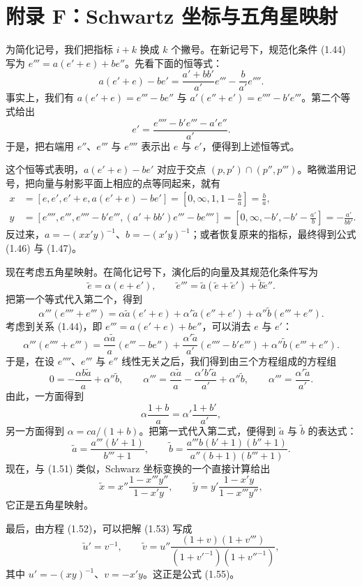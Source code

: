 \section{附录 F：Schwartz 坐标与五角星映射}

为简化记号，我们把指标 $i+k$ 换成 $k$ 个撇号。在新记号下，规范化条件 (1.44) 写为 $e'''=a(e'+e)+be''$。先看下面的恒等式：
\[
a(e'+e)-be'=\frac{a'+bb'}{a'}e'''-\frac{b}{a'}e''''.
\]
事实上，我们有 $a(e'+e)=e'''-be''$ 与 $a'(e''+e')=e''''-b'e'''$。第二个等式给出
\[
e'=\frac{e''''-b'e'''-a'e''}{a'}.
\]
于是，把右端用 $e''$、$e'''$ 与 $e''''$ 表示出 $e$ 与 $e'$，便得到上述恒等式。

这个恒等式表明，$a(e'+e)-be'$ 对应于交点 $(p,p')\cap(p'',p''')$。略微滥用记号，把向量与射影平面上相应的点等同起来，就有
\begin{equation}
\begin{aligned}
x&=\left[e,e',e'+e,a(e'+e)-be'\right]
 =\left[0,\infty,1,1-\frac ba\right] =\frac ba,\\
y&=\left[e'''',e''',e''''-b'e''',(a'+bb')e'''-be''''\right]
 =\left[0,\infty,-b',-b'-\frac{a'}{b}\right] =-\frac{a'}{bb'}.
\end{aligned}
\tag{1.58}\label{eq:1.58}
\end{equation}
反过来，$a=-(xx'y)^{-1}$、$b=-(x'y)^{-1}$；或者恢复原来的指标，最终得到公式 (1.46) 与 (1.47)。

现在考虑五角星映射。在简化记号下，演化后的向量及其规范化条件写为
\[
\tilde e=\alpha(e+e'),\qquad
\tilde e'''=\tilde a(\tilde e+\tilde e')+\tilde b\tilde e''.
\]
把第一个等式代入第二个，得到
\[
\alpha'''(e''''+e''')=\alpha\tilde a(e'+e)+\alpha'\tilde a(e''+e')+\alpha''\tilde b(e'''+e'').
\]
考虑到关系 (1.44)，即 $e'''=a(e'+e)+be''$，可以消去 $e$ 与 $e'$：
\[
\alpha'''(e''''+e''')=\frac{\alpha\tilde a}{a}(e'''-be'')+\frac{\alpha'\tilde a}{a'}(e''''-b'e''')+\alpha''\tilde b(e'''+e'').
\]
于是，在设 $e''''$、$e'''$ 与 $e''$ 线性无关之后，我们得到由三个方程组成的方程组
\[
0=-\frac{\alpha b\tilde a}{a}+\alpha''\tilde b,\qquad
\alpha'''=\frac{\alpha\tilde a}{a}-\frac{\alpha'b'\tilde a}{a'}+\alpha''\tilde b,\qquad
\alpha'''=\frac{\alpha'\tilde a}{a'}.
\]
由此，一方面得到
\[
\alpha\frac{1+b}{a}=\alpha'\frac{1+b'}{a'},
\]
另一方面得到 $\alpha=ca/(1+b)$。把第一式代入第二式，便得到 $\tilde a$ 与 $\tilde b$ 的表达式：
\[
\tilde a=\frac{a'''(b'+1)}{b'''+1},\qquad
\tilde b=\frac{a'''b(b'+1)(b''+1)}{a''(b+1)(b'''+1)}.
\]
现在，与 (1.51) 类似，Schwarz 坐标变换的一个直接计算给出
\[
\tilde x=x''\frac{1-x'''y''}{1-x'y},\qquad
\tilde y=y'\frac{1-x'y}{1-x'''y''},
\]
它正是五角星映射。

最后，由方程 (1.52)，可以把解 (1.53) 写成
\[
\tilde u'=v^{-1},\qquad
\tilde v=u''\frac{(1+v)(1+v''')}{(1+v'^{-1})(1+v''^{-1})},
\]
其中 $u'=-(xy)^{-1}$、$v=-x'y$。这正是公式 (1.55)。
